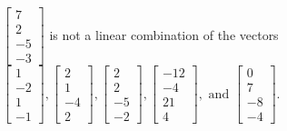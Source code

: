 \begin{exerciseAnswer}
\begin{enumerate}[(a)]
\( \left[\begin{array}{c}
7 \\
2 \\
-5 \\
-3
\end{array}\right] \) is not a linear combination of the vectors \( \left[\begin{array}{c}
1 \\
-2 \\
1 \\
-1
\end{array}\right] , \left[\begin{array}{c}
2 \\
1 \\
-4 \\
2
\end{array}\right] , \left[\begin{array}{c}
2 \\
2 \\
-5 \\
-2
\end{array}\right] , \left[\begin{array}{c}
-12 \\
-4 \\
21 \\
4
\end{array}\right] , \text{ and } \left[\begin{array}{c}
0 \\
7 \\
-8 \\
-4
\end{array}\right] \). 


\end{enumerate}
    
\end{exerciseAnswer}
    
